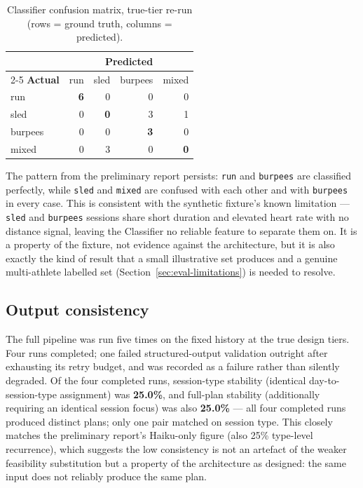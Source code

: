 \begin{table}[H]
\centering
\caption{Classifier confusion matrix, true-tier re-run (rows = ground truth, columns = predicted).}
\label{tab:confusion-draft}
\begin{tabular}{lrrrr}
\toprule
 & \multicolumn{4}{c}{\textbf{Predicted}} \\
\cmidrule(l){2-5}
\textbf{Actual} & run & sled & burpees & mixed \\
\midrule
run     & \textbf{6} & 0 & 0 & 0 \\
sled    & 0 & \textbf{0} & 3 & 1 \\
burpees & 0 & 0 & \textbf{3} & 0 \\
mixed   & 0 & 3 & 0 & \textbf{0} \\
\bottomrule
\end{tabular}
\end{table}

The pattern from the preliminary report persists: \texttt{run} and \texttt{burpees} are classified perfectly, while \texttt{sled} and \texttt{mixed} are confused with each other and with \texttt{burpees} in every case. This is consistent with the synthetic fixture's known limitation --- \texttt{sled} and \texttt{burpees} sessions share short duration and elevated heart rate with no distance signal, leaving the Classifier no reliable feature to separate them on. It is a property of the fixture, not evidence against the architecture, but it is also exactly the kind of result that a small illustrative set produces and a genuine multi-athlete labelled set (Section~\ref{sec:eval-limitations}) is needed to resolve.

\subsection{Output consistency}

The full pipeline was run five times on the fixed history at the true design tiers. Four runs completed; one failed structured-output validation outright after exhausting its retry budget, and was recorded as a failure rather than silently degraded. Of the four completed runs, session-type stability (identical day-to-session-type assignment) was \textbf{25.0\%}, and full-plan stability (additionally requiring an identical session focus) was also \textbf{25.0\%} --- all four completed runs produced distinct plans; only one pair matched on session type. This closely matches the preliminary report's Haiku-only figure (also 25\% type-level recurrence), which suggests the low consistency is not an artefact of the weaker feasibility substitution but a property of the architecture as designed: the same input does not reliably produce the same plan.

